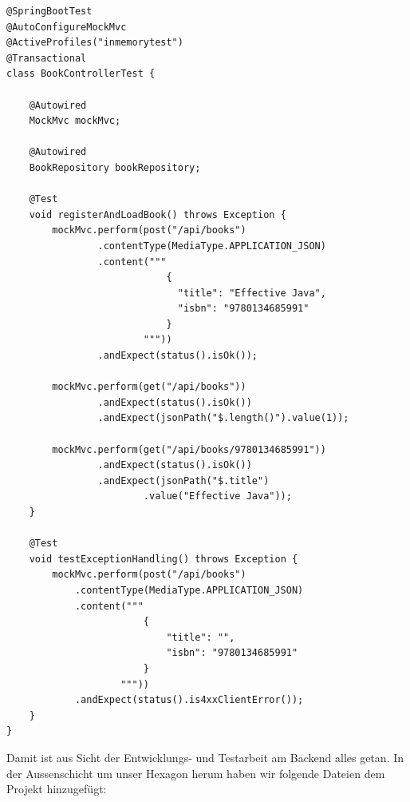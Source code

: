 \begin{listing}[H]
\begin{verbatim}
@SpringBootTest
@AutoConfigureMockMvc
@ActiveProfiles("inmemorytest")
@Transactional
class BookControllerTest {

    @Autowired
    MockMvc mockMvc;

    @Autowired
    BookRepository bookRepository;

    @Test
    void registerAndLoadBook() throws Exception {
        mockMvc.perform(post("/api/books")
                .contentType(MediaType.APPLICATION_JSON)
                .content("""
                            {
                              "title": "Effective Java",
                              "isbn": "9780134685991"
                            }
                        """))
                .andExpect(status().isOk());

        mockMvc.perform(get("/api/books"))
                .andExpect(status().isOk())
                .andExpect(jsonPath("$.length()").value(1));

        mockMvc.perform(get("/api/books/9780134685991"))
                .andExpect(status().isOk())
                .andExpect(jsonPath("$.title")
                        .value("Effective Java"));
    }

    @Test
    void testExceptionHandling() throws Exception {
        mockMvc.perform(post("/api/books")
            .contentType(MediaType.APPLICATION_JSON)
            .content("""
                        {
                            "title": "",
                            "isbn": "9780134685991"
                        }
                    """))
            .andExpect(status().is4xxClientError());
    }
}
\end{verbatim}
\caption{Integrationstest des REST Controllers}
\label{lst:BookControllerTest}
\end{listing}

Damit ist aus Sicht der Entwicklungs- und Testarbeit am Backend alles getan.
In der Aussenschicht um unser Hexagon herum haben wir folgende Dateien dem 
Projekt hinzugefügt:

%

